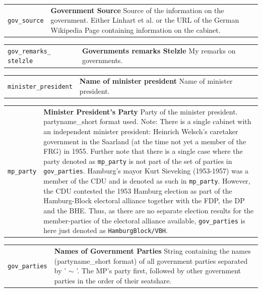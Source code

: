 \documentclass[
]{scrartcl}
\begin{document}
\begin{longtable}{p{3.2cm}| p{11cm}}
\texttt{gov\_source} &\textbf{Government Source}\newline 
Source of the information on the government. Either Linhart et al. or the URL of the German Wikipedia Page containing information on the cabinet.
\end{longtable}

\begin{longtable}{p{3.2cm}| p{11cm}}
\texttt{gov\_remarks\_
stelzle} &\textbf{Governments remarks Stelzle}\newline 
My remarks on governments.
\end{longtable}

\begin{longtable}{p{3.2cm}| p{11cm}}
\texttt{minister\_president} &\textbf{Name of minister president}\newline 
Name of minister president.
\end{longtable}

\begin{longtable}{p{3.2cm}| p{11cm}}
\texttt{mp\_party} &\textbf{Minister President's Party}\newline 
Party of the minister president. partyname\_short format used. Note: There is a single cabinet with an independent minister president: Heinrich Welsch's caretaker government in the Saarland (at the time not yet a member of the FRG) in 1955. Further note that there is a single case where the party denoted as \texttt{mp\_party} is not part of the set of parties in \texttt{gov\_parties}. Hamburg's mayor Kurt Sieveking (1953-1957) was a member of the CDU and is denoted as such in \texttt{mp\_party}. However, the CDU contested the 1953 Hamburg election as part of the Hamburg-Block electoral alliance together with the FDP, the DP and the BHE. Thus, as there are no separate election results for the member-parties of the electoral alliance available, \texttt{gov\_parties} is here just denoted as \texttt{HamburgBlock/VBH}.
\end{longtable}

\begin{longtable}{p{3.2cm}| p{11cm}}
\texttt{gov\_parties} &\textbf{Names of Government Parties}\newline 
String containing the names (partyname\_short format) of all government parties separated by ' $\sim$ '. The MP's party first, followed by other government parties in the order of their seatshare.
\end{longtable}
\end{document}

